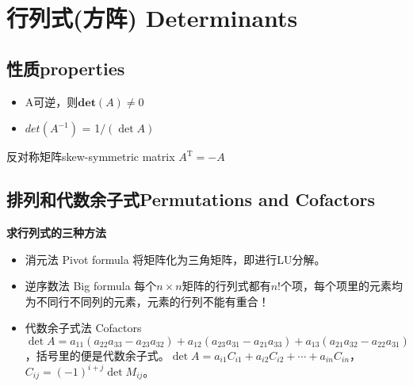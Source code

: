     \section{行列式(方阵) Determinants}
    \subsection{性质properties}
    \begin{itemize}
        \item A可逆，则$\bm{det}(A) \neq 0$
        \item $det(A^{-1})$ = 1$/(\operatorname{det} A)$
    \end{itemize}
    反对称矩阵skew-symmetric matrix $A^{\mathrm{T}}=-A$
    \subsection{排列和代数余子式Permutations and Cofactors}
    \textbf{求行列式的三种方法}
    \begin{itemize}
        \item 消元法 Pivot formula 将矩阵化为三角矩阵，即进行LU分解。
        \item 逆序数法 Big formula 每个$n\times n$矩阵的行列式都有$n!$个项，每个项里的元素均为不同行不同列的元素，元素的行列不能有重合！
        \item 代数余子式法 Cofactors $\operatorname{det} A=a_{11}\left(a_{22} a_{33}-a_{23} a_{32}\right)+a_{12}\left(a_{23} a_{31}-a_{21} a_{33}\right)+a_{13}\left(a_{21} a_{32}-a_{22} a_{31}\right)$，括号里的便是代数余子式。$\operatorname{det} A=a_{i 1} C_{i 1}+a_{i 2} C_{i 2}+\cdots+a_{i n} C_{i n}$，$C_{i j}=(-1)^{i+j} \operatorname{det} M_{i j}$。
    \end{itemize}

